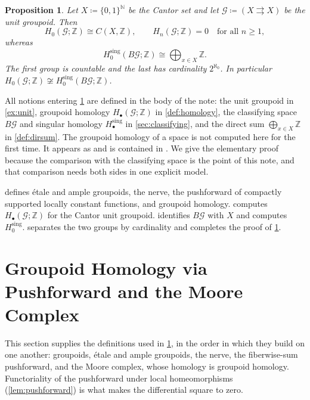 \documentclass{extracta-temp-26}
\numberwithin{equation}{section}
\newtheorem{prop}[teo]{Proposition}
\theoremstyle{definition}
\theoremstyle{remark}
\newcommand{\G}{\mathcal{G}}
\newcommand{\Z}{\mathbb{Z}}
\newcommand{\N}{\mathbb{N}}
\newcommand{\Hsing}{H^{\mathrm{sing}}}
\begin{document}
\begin{prop}\label{prop:main}
Let \(X\coloneqq\{0,1\}^{\N}\) be the Cantor set and let \(\G\coloneqq(X\rightrightarrows X)\) be the unit groupoid.
Then
\begin{equation}\label{eq:main-moore}
H_0(\G;\Z)\cong C(X,\Z),\qquad
H_n(\G;\Z)=0\quad\text{for all } n\ge 1,
\end{equation}
whereas
\begin{equation}\label{eq:main-sing}
\Hsing_0(B\G;\Z)\cong\bigoplus_{x\in X}\Z.
\end{equation}
The first group is countable and the last has cardinality \(2^{\aleph_0}\).
In particular \(H_0(\G;\Z)\not\cong\Hsing_0(B\G;\Z)\).
\end{prop}

All notions entering \cref{prop:main} are defined in the body of the note: the unit groupoid in \cref{ex:unit}, groupoid homology \(H_\bullet(\G;\Z)\) in \cref{def:homology}, the classifying space \(B\G\) and singular homology \(\Hsing_\bullet\) in \cref{sec:classifying}, and the direct sum \(\bigoplus_{x\in X}\Z\) in \cref{def:dirsum}.
The groupoid homology of a space is not computed here for the first time. It appears as \cite[Proposition~4.4]{farsi2019ample} and is contained in \cite[3.5(3)]{crainic2000homology}.
We give the elementary proof because the comparison with the classifying space is the point of this note, and that comparison needs both sides in one explicit model.

 defines \'etale and ample groupoids, the nerve, the pushforward of compactly supported locally constant functions, and groupoid homology.
 computes \(H_\bullet(\G;\Z)\) for the Cantor unit groupoid.
 identifies \(B\G\) with \(X\) and computes \(\Hsing_0\).
 separates the two groups by cardinality and completes the proof of \cref{prop:main}.

\section{Groupoid Homology via Pushforward and the Moore Complex}\label{sec:pushforward}
This section supplies the definitions used in \cref{prop:main}, in the order in which they build on one another: groupoids, \'etale and ample groupoids, the nerve, the fiberwise-sum pushforward, and the Moore complex, whose homology is groupoid homology.
Functoriality of the pushforward under local homeomorphisms (\cref{lem:pushforward}) is what makes the differential square to zero.
\end{document}
